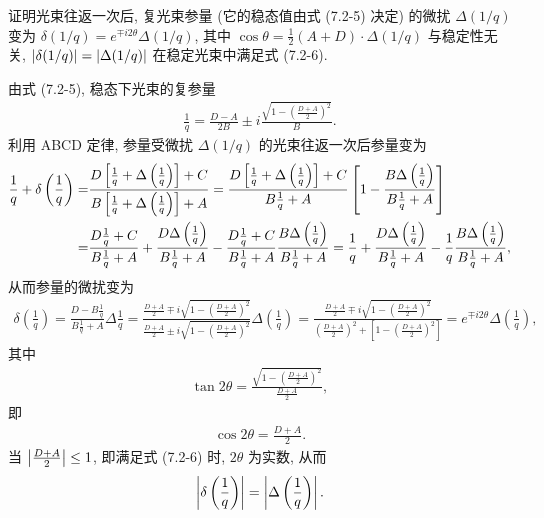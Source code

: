 \documentclass{note}
\begin{document}
\begin{exe}
    证明光束往返一次后, 复光束参量 (它的稳态值由式 (7.2-5) 决定) 的微扰 $\Delta(1/q)$ 变为 $\delta(1/q)=e^{\mp i2\theta}\Delta(1/q)$, 其中 $\cos\theta=\frac{1}{2}(A+D)\cdot\Delta(1/q)$ 与稳定性无关, $\left\lvert\delta(1/q)\right\rvert=\left\lvert\Delta(1/q)\right\rvert$ 在稳定光束中满足式 (7.2-6).
\end{exe}
\begin{pf}
    由式 (7.2-5), 稳态下光束的复参量
    \begin{align}
        \frac{1}{q}=\frac{D-A}{2B}\pm i\frac{\sqrt{1-\left(\frac{D+A}{2}\right)^2}}{B}.
    \end{align}
    利用 ABCD 定律, 参量受微扰 $\Delta(1/q)$ 的光束往返一次后参量变为
    \begin{align}
        \notag\frac{1}{q}+\delta\left(\frac{1}{q}\right)=&\frac{D\left[\frac{1}{q}+\Delta\left(\frac{1}{q}\right)\right]+C}{B\left[\frac{1}{q}+\Delta\left(\frac{1}{q}\right)\right]+A}=\frac{D\left[\frac{1}{q}+\Delta\left(\frac{1}{q}\right)\right]+C}{B\frac{1}{q}+A}\left[1-\frac{B\Delta\left(\frac{1}{q}\right)}{B\frac{1}{q}+A}\right]\\
        =&\frac{D\frac{1}{q}+C}{B\frac{1}{q}+A}+\frac{D\Delta\left(\frac{1}{q}\right)}{B\frac{1}{q}+A}-\frac{D\frac{1}{q}+C}{B\frac{1}{q}+A}\frac{B\Delta\left(\frac{1}{q}\right)}{B\frac{1}{q}+A}=\frac{1}{q}+\frac{D\Delta\left(\frac{1}{q}\right)}{B\frac{1}{q}+A}-\frac{1}{q}\frac{B\Delta\left(\frac{1}{q}\right)}{B\frac{1}{q}+A},
    \end{align}
    从而参量的微扰变为
    \begin{align}
        \delta\left(\frac{1}{q}\right)=\frac{D-B\frac{1}{q}}{B\frac{1}{q}+A}\Delta\frac{1}{q}=\frac{\frac{D+A}{2}\mp i\sqrt{1-\left(\frac{D+A}{2}\right)^2}}{\frac{D+A}{2}\pm i\sqrt{1-\left(\frac{D+A}{2}\right)^2}}\Delta\left(\frac{1}{q}\right)=\frac{\frac{D+A}{2}\mp i\sqrt{1-\left(\frac{D+A}{2}\right)^2}}{\left(\frac{D+A}{2}\right)^2+\left[1-\left(\frac{D+A}{2}\right)^2\right]}=e^{\mp i2\theta}\Delta\left(\frac{1}{q}\right),
    \end{align}
    其中
    \begin{align}
        \tan 2\theta=\frac{\sqrt{1-\left(\frac{D+A}{2}\right)^2}}{\frac{D+A}{2}},
    \end{align}
    即
    \begin{align}
        \cos 2\theta=\frac{D+A}{2}.
    \end{align}
    当 $\left\lvert\frac{D+A}{2}\right\rvert\leq 1$, 即满足式 (7.2-6) 时, $2\theta$ 为实数, 从而
    \begin{align}
        \left\lvert\delta\left(\frac{1}{q}\right)\right\rvert=\left\lvert\Delta\left(\frac{1}{q}\right)\right\rvert.
    \end{align}
\end{pf}
\ifx\allfiles\undefined
\end{document}
